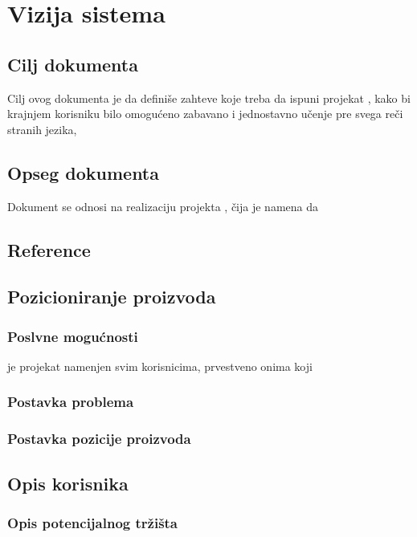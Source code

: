 \part{Vizija sistema}

\chapter{Cilj dokumenta}
Cilj ovog dokumenta je da definiše zahteve koje treba da ispuni projekat \UpamtiMe, kako bi krajnjem korisniku bilo omogućeno zabavano i jednostavno učenje pre svega reči stranih jezika, %



\chapter{Opseg dokumenta}
Dokument se odnosi na realizaciju projekta \UpamtiMe, čija je namena da %




\chapter{Reference}




\chapter{Pozicioniranje proizvoda}

\section{Poslvne mogućnosti}
\UpamtiMe je projekat namenjen svim korisnicima, prvestveno onima koji %

\section{Postavka problema}

\section{Postavka pozicije proizvoda}




\chapter{Opis korisnika}

\section{Opis potencijalnog tržišta}

